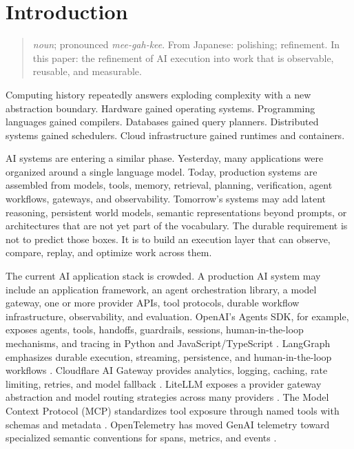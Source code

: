 \section{Introduction}

\begin{quote}
\textbf{\migaki{}} \emph{noun}; pronounced \emph{mee-gah-kee}. From Japanese: polishing; refinement. In this paper: the refinement of AI execution into work that is observable, reusable, and measurable.
\end{quote}

Computing history repeatedly answers exploding complexity with a new abstraction boundary. Hardware gained operating systems. Programming languages gained compilers. Databases gained query planners. Distributed systems gained schedulers. Cloud infrastructure gained runtimes and containers.

AI systems are entering a similar phase. Yesterday, many applications were organized around a single language model. Today, production systems are assembled from models, tools, memory, retrieval, planning, verification, agent workflows, gateways, and observability. Tomorrow's systems may add latent reasoning, persistent world models, semantic representations beyond prompts, or architectures that are not yet part of the vocabulary. The durable requirement is not to predict those boxes. It is to build an execution layer that can observe, compare, replay, and optimize work across them.

The current AI application stack is crowded. A production AI system may include an application framework, an agent orchestration library, a model gateway, one or more provider APIs, tool protocols, durable workflow infrastructure, observability, and evaluation. OpenAI's Agents SDK, for example, exposes agents, tools, handoffs, guardrails, sessions, human-in-the-loop mechanisms, and tracing in Python and JavaScript/TypeScript \citep{openai_agents_python,openai_agents_js,openai_agents_tracing}. LangGraph emphasizes durable execution, streaming, persistence, and human-in-the-loop workflows \citep{langgraph_overview}. Cloudflare AI Gateway provides analytics, logging, caching, rate limiting, retries, and model fallback \citep{cloudflare_ai_gateway}. LiteLLM exposes a provider gateway abstraction and model routing strategies across many providers \citep{litellm_routing}. The Model Context Protocol (MCP) standardizes tool exposure through named tools with schemas and metadata \citep{mcp_tools}. OpenTelemetry has moved GenAI telemetry toward specialized semantic conventions for spans, metrics, and events \citep{otel_genai}.

